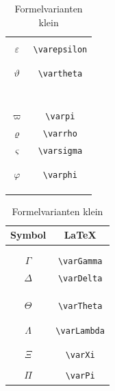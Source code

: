 \begin{table}[ht]
\begin{subtable}[b]{0.265\linewidth}
\begin{tabular}{c|c}
						&\\
						$\varepsilon$ & \lstinline|\varepsilon|\\
						&\\
						&\\
						$\vartheta$ & \lstinline|\vartheta|\\
						&\\
						&\\
						&\\
						&\\
						&\\
						&\\
						&\\
						$\varpi$ & \lstinline|\varpi|\\
						$\varrho$ & \lstinline|\varrho|\\
						$\varsigma$ & \lstinline|\varsigma| \\
						&\\
						&\\
						$\varphi$ & \lstinline|\varphi|\\
						&\\
						&\\
						&\\						
					\end{tabular}
					\caption{Formelvarianten klein}
				\end{subtable}
				\begin{subtable}[b]{0.24\linewidth}
					\begin{tabular}{c|c}
						Symbol & \LaTeX\\\hline
						&\\
						&\\
						$\varGamma$ & \lstinline|\varGamma|\\
						$\varDelta$ & \lstinline|\varDelta|\\
						&\\
						&\\
						&\\
						$\varTheta$ & \lstinline|\varTheta|\\
						&\\
						&\\
						$\varLambda$ & \lstinline|\varLambda|\\
						&\\
						&\\
						$\varXi$ & \lstinline|\varXi| \\
						&\\
						$\varPi$ & \lstinline|\varPi|\\

\end{tabular}
\end{subtable}
\end{table}
